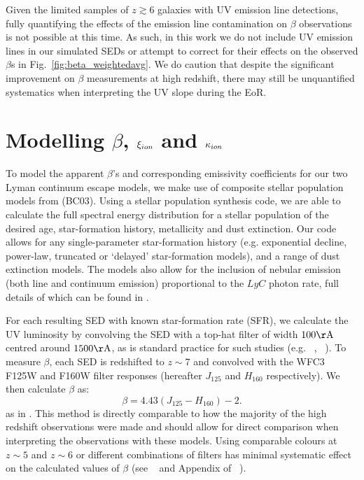 Given the limited samples of $z\gtrsim 6$ galaxies with UV emission line detections, fully quantifying the effects of the emission line contamination on $\beta$ observations is not possible at this time. As such, in this work we do not include UV emission lines in our simulated SEDs or attempt to correct for their effects on the observed $\beta$s in Fig.~\ref{fig:beta_weightedavg}. We do caution that despite the significant improvement on  $\beta$ measurements at high redshift, there may still be unquantified systematics when interpreting the UV slope during the EoR.

\section{Modelling $\beta$, $\xi_{\lowercase{ion}}$ and $\kappa_{\lowercase{ion}}$} \label{sec:models}
To model the apparent $\beta$'s and corresponding emissivity coefficients for our two Lyman continuum escape models, we make use of composite stellar population models from \citet{Bruzual:2003ckb} (BC03). Using a stellar population synthesis code, we are able to calculate the full spectral energy distribution for a stellar population of the desired age, star-formation history, metallicity and dust extinction. Our code allows for any single-parameter star-formation history (e.g. exponential decline, power-law, truncated or `delayed' star-formation models), and a range of dust extinction models. The models also allow for the inclusion of nebular emission (both line and continuum emission) proportional to the $LyC$ photon rate, full details of which can be found in \citet{Duncan:2014gh}.

For each resulting SED with known star-formation rate (SFR), we calculate the UV luminosity by convolving the SED with a top-hat filter of width $100\rm{\AA}$ centred around $1500\rm{\AA}$, as is standard practice for such studies (e.g. \citeauthor{Finkelstein:2012hr}~\citeyear{Finkelstein:2012hr}, \citeauthor{McLure:2013hh}~\citeyear{McLure:2013hh}). To measure \(\beta \), each SED is redshifted to \(z \sim 7 \) and convolved with the WFC3 F125W and F160W filter responses (hereafter \(J_{125} \) and \(H_{160}\) respectively). We then calculate \( \beta \) as: 
\begin{equation}\label{eq:beta_calc}
    \beta = 4.43(J_{125} - H_{160}) - 2. 
\end{equation}
as in \citet{Dunlop:2013kp}. This method is directly comparable to how the majority of the high redshift observations were made and should allow for direct comparison when interpreting the observations with these models. Using comparable colours at $z\sim5$ and $z\sim6$ or different combinations of filters has minimal systematic effect on the calculated values of $\beta$ (see \citeauthor{Dunlop:2011jl}~\citeyear{Dunlop:2011jl} and Appendix of \citet{}\citeauthor{2012ApJ...754...83B}~\citeyear{2012ApJ...754...83B}).

